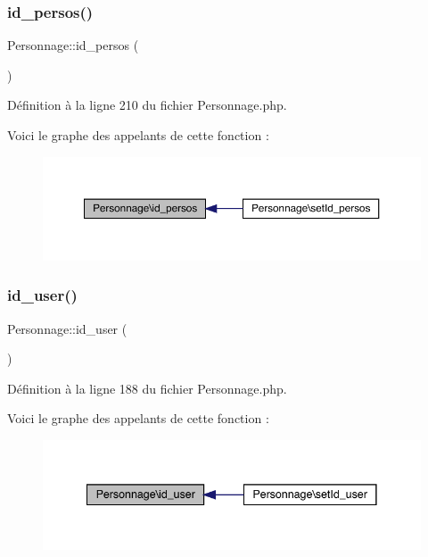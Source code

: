 \subsubsection{\texorpdfstring{id\+\_\+persos()}{id\_persos()}}
{\footnotesize\ttfamily Personnage\+::id\+\_\+persos (\begin{DoxyParamCaption}{ }\end{DoxyParamCaption})}



Définition à la ligne 210 du fichier Personnage.\+php.

Voici le graphe des appelants de cette fonction \+:\nopagebreak
\begin{figure}[H]
\begin{center}
\leavevmode
\includegraphics[width=350pt]{class_personnage_ab0fc8802437d3f7bbc0da720597d0393_icgraph}
\end{center}
\end{figure}
\mbox{\label{class_personnage_a83ccdd40630a166b7a1f5c84dd742e8c}} 
\subsubsection{\texorpdfstring{id\+\_\+user()}{id\_user()}}
{\footnotesize\ttfamily Personnage\+::id\+\_\+user (\begin{DoxyParamCaption}{ }\end{DoxyParamCaption})}



Définition à la ligne 188 du fichier Personnage.\+php.

Voici le graphe des appelants de cette fonction \+:\nopagebreak
\begin{figure}[H]
\begin{center}
\leavevmode
\includegraphics[width=341pt]{class_personnage_a83ccdd40630a166b7a1f5c84dd742e8c_icgraph}
\end{center}
\end{figure}
\mbox{\label{class_personnage_a744674b144008a43e37036344accb378}} 
